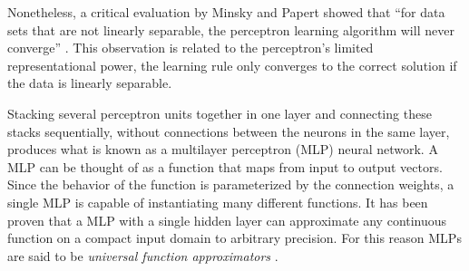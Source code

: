 Nonetheless, a critical evaluation by Minsky and Papert \cite{papert1969perceptrons} showed that ``for data sets that are not linearly separable, the perceptron learning algorithm will never converge'' \cite{bishop2006pattern}. This observation is related to the perceptron's limited representational power, the learning rule only converges to the correct solution if the data is linearly separable.

Stacking several perceptron units together in one layer and connecting these
stacks sequentially, without connections between the neurons in the same layer,
produces what is known as a multilayer perceptron (MLP) neural network. A MLP can be thought of as a function that maps from input to output vectors. Since the behavior of the function is parameterized by the connection weights, a single MLP is capable of instantiating many different functions. It has been proven \cite{hornik1989multilayer} that a MLP
with a single hidden layer can approximate any continuous function on a compact input domain to arbitrary precision. For this reason MLPs are said to be \textit{universal function approximators} \cite{hornik1989multilayer}.

%


